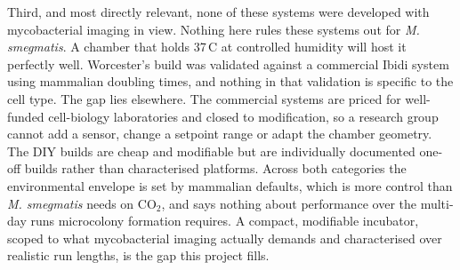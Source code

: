 Third, and most directly relevant, none of these systems were developed with mycobacterial imaging in view. Nothing here rules these systems out for \textit{M. smegmatis}. A chamber that holds 37\,\textdegree{}C at controlled humidity will host it perfectly well. Worcester's build was validated against a commercial Ibidi system using mammalian doubling times, and nothing in that validation is specific to the cell type. The gap lies elsewhere. The commercial systems are priced for well-funded cell-biology laboratories and closed to modification, so a research group cannot add a sensor, change a setpoint range or adapt the chamber geometry. The DIY builds are cheap and modifiable but are individually documented one-off builds rather than characterised platforms. Across both categories the environmental envelope is set by mammalian defaults, which is more control than \textit{M. smegmatis} needs on CO$_2$, and says nothing about performance over the multi-day runs microcolony formation requires. A compact, modifiable incubator, scoped to what mycobacterial imaging actually demands and characterised over realistic run lengths, is the gap this project fills.

